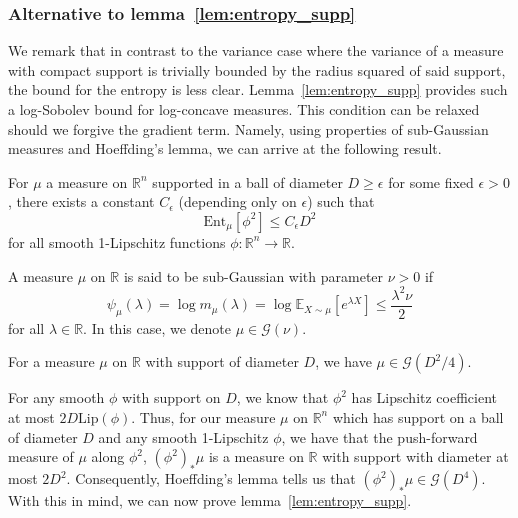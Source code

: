 \subsubsection{Alternative to lemma~\ref{lem:entropy_supp}}

We remark that in contrast to the variance case where the variance of a measure with compact 
support is trivially bounded by the radius squared of said support, the bound for the entropy is less 
clear. Lemma~\ref{lem:entropy_supp} provides such a log-Sobolev bound for log-concave measures. 
This condition can be relaxed should we forgive the gradient term. Namely, using properties of 
sub-Gaussian measures and Hoeffding's lemma, we can arrive at the following result.

\begin{lemma}\label{lem:entropy_supp2}
  For \(\mu\) a measure on \(\mathbb{R}^n\) supported in a ball of diameter \(D \ge \epsilon\) for some fixed \(\epsilon > 0\), 
  there exists a constant \(C_\epsilon\) (depending only on \(\epsilon\)) such that 
  \[\text{Ent}_\mu[\phi^2] \le C_\epsilon D^2\]
  for all smooth 1-Lipschitz functions \(\phi : \mathbb{R}^n \to \mathbb{R}\).
\end{lemma}

\begin{definition}
  A measure \(\mu\) on \(\mathbb{R}\) is said to be sub-Gaussian with parameter \(\nu > 0\) if 
  \[\psi_\mu(\lambda) = \log m_{\mu}(\lambda) = \log \mathbb{E}_{X \sim \mu}[e^{\lambda X}] \le \frac{\lambda^2\nu}{2}\]
  for all \(\lambda \in \mathbb{R}\). In this case, we denote \(\mu \in \mathcal{G}(\nu)\).
\end{definition}

\begin{lemma}
  For a measure \(\mu\) on \(\mathbb{R}\) with support of diameter \(D\), we have \(\mu \in \mathcal{G}(D^2 / 4)\).
\end{lemma}

For any smooth \(\phi\) with support on \(D\), we know that \(\phi^2\) has Lipschitz coefficient 
at most \(2D \text{Lip}(\phi)\). Thus, for our measure \(\mu\) on \(\mathbb{R}^n\) which has support on a ball of diameter \(D\) 
and any smooth 1-Lipschitz \(\phi\), we have that the push-forward measure of \(\mu\) along \(\phi^2\), 
\((\phi^2)_* \mu\) is a measure on \(\mathbb{R}\) with support 
with diameter at most \(2D^2\). Consequently, Hoeffding's lemma tells us that \((\phi^2)_* \mu \in \mathcal{G}(D^4)\).  
With this in mind, we can now prove lemma~\ref{lem:entropy_supp}.

